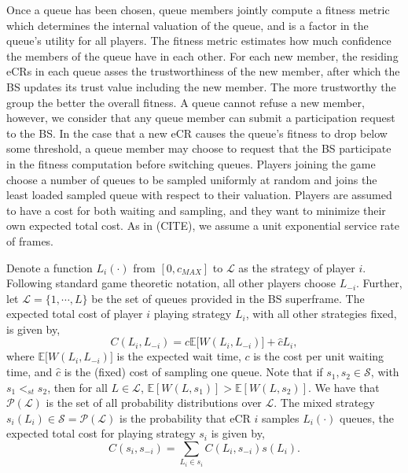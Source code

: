 \documentclass[10pt]{article}
\newcommand{\mcL}{\mathcal{L}}
\newcommand{\mcP}{\mathcal{P}}
\newcommand{\mcS}{\mathcal{S}}
\theoremstyle{definition}
\begin{document}
Once a queue has been chosen, queue members jointly
compute a fitness metric which determines the internal valuation of the queue,
and is a factor in the queue's utility for all players. The fitness metric estimates how much
confidence the members of the queue have in each other. For each new member,
the residing eCRs in each queue asses the trustworthiness of the new member, after which the BS
updates its trust value including the new member. The more trustworthy the group
the better the overall fitness. A queue cannot refuse a new member, however, we
consider that any queue member can submit a participation request to the BS. In the case
that a new eCR causes the queue's fitness to drop below some threshold, a queue
member may choose to request that the BS participate in the fitness computation
before switching queues. 
Players joining the game choose a number of
queues to be sampled uniformly at random and joins the least loaded sampled
queue with respect to their valuation. Players are assumed to have a cost for both waiting and sampling, and they
want to minimize their own expected total cost. As in (CITE), we assume a unit exponential service rate of frames.

Denote a function $L_i(\cdot)$ from $[0, c_{MAX}]$ to
$\mcL$ as the strategy of player $i$. Following
standard game theoretic notation, all other players choose $L_{-i}$.
Further, let $\mcL = \lbrace 1,\cdots,L\rbrace$ be the set of
queues provided in the BS superframe. The expected total cost of player $i$ playing 
strategy $L_i$, with all other strategies fixed, is given by, 
$$
    C(L_i,L_{-i}) = c\mathbb{E}\lbrack W(L_i,L_{-i})\rbrack + \hat c L_i,
$$
where $\mathbb{E}\lbrack W(L_i,L_{-i})\rbrack$ is the
expected wait time, $c$ is the cost per unit waiting time, and $\hat c$ is the
(fixed) cost of sampling one queue. Note that if $s_1, s_2 \in \mcS$, with $s_1
<_{st} s_2$, then for all $L\in\mcL$, $\mathbb{E}[W(L,s_1)] >
\mathbb{E}[W(L,s_2)]$.
We have
that $\mcP(\mcL)$ is the set of all probability distributions over $\mcL$. The mixed
strategy $s_i(L_i) \in \mcS=\mcP(\mcL)$ is the probability that
eCR $i$ samples $L_i(\cdot)$ queues, 
the expected total cost for playing strategy $s_i$ is given by,
$$
    C(s_i, s_{-i}) = \displaystyle \sum_{L_i \in s_i} C(L_i,s_{-i})s(L_i).
$$
\end{document}
